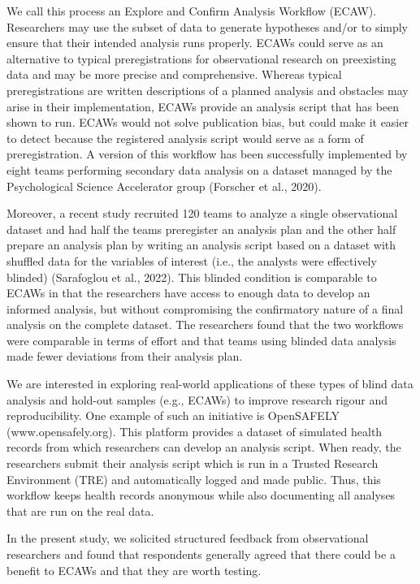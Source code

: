 \documentclass[
  man]{apa6}
\begin{document}
We call this process an Explore and Confirm Analysis Workflow (ECAW). Researchers may use the subset of data to generate hypotheses and/or to simply ensure that their intended analysis runs properly. ECAWs could serve as an alternative to typical preregistrations for observational research on preexisting data and may be more precise and comprehensive. Whereas typical preregistrations are written descriptions of a planned analysis and obstacles may arise in their implementation, ECAWs provide an analysis script that has been shown to run. ECAWs would not solve publication bias, but could make it easier to detect because the registered analysis script would serve as a form of preregistration. A version of this workflow has been successfully implemented by eight teams performing secondary data analysis on a dataset managed by the Psychological Science Accelerator group (Forscher et al., 2020).

Moreover, a recent study recruited 120 teams to analyze a single observational dataset and had half the teams preregister an analysis plan and the other half prepare an analysis plan by writing an analysis script based on a dataset with shuffled data for the variables of interest (i.e., the analysts were effectively blinded) (Sarafoglou et al., 2022). This blinded condition is comparable to ECAWs in that the researchers have access to enough data to develop an informed analysis, but without compromising the confirmatory nature of a final analysis on the complete dataset. The researchers found that the two workflows were comparable in terms of effort and that teams using blinded data analysis made fewer deviations from their analysis plan.

We are interested in exploring real-world applications of these types of blind data analysis and hold-out samples (e.g., ECAWs) to improve research rigour and reproducibility. One example of such an initiative is OpenSAFELY (www.opensafely.org). This platform provides a dataset of simulated health records from which researchers can develop an analysis script. When ready, the researchers submit their analysis script which is run in a Trusted Research Environment (TRE) and automatically logged and made public. Thus, this workflow keeps health records anonymous while also documenting all analyses that are run on the real data.

In the present study, we solicited structured feedback from observational researchers and found that respondents generally agreed that there could be a benefit to ECAWs and that they are worth testing.
\end{document}
